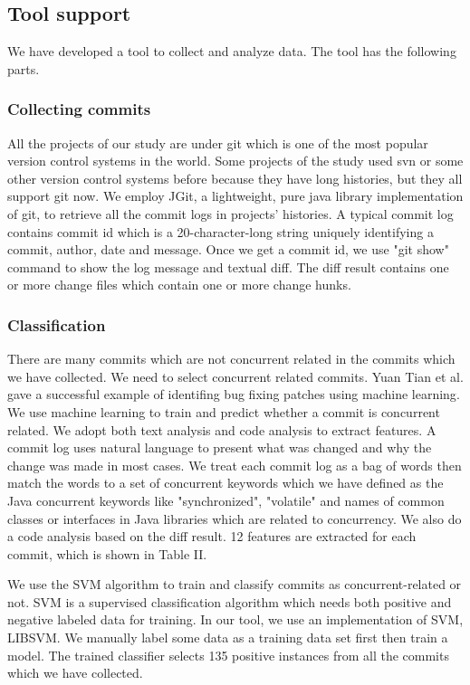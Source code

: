 \documentclass[conference]{IEEEtran}
\begin{document}
\subsection{Tool support}
We have developed a tool to collect and analyze data. The tool has the following parts.

\subsubsection{Collecting commits}
All the projects of our study are under git which is one of the most popular version control systems in the world. Some projects of the study used svn or some other version control systems before because they have long histories, but they all support git now. We employ JGit, a  lightweight, pure java library implementation of git, to retrieve all the commit logs in projects' histories. A typical commit log contains commit id which is a 20-character-long string uniquely identifying a commit, author, date and message. Once we get a commit id, we use "git show" command to show the log message and textual diff. The diff result contains one or more change files which contain one or more change hunks.

\subsubsection{Classification}
There are many commits which are not concurrent related in the commits which we have collected.  We need to select concurrent related commits. Yuan Tian et al. gave a successful example of identifing bug fixing patches using machine learning\cite{conf/icse/TianLL12}. We use machine learning to train and predict whether a commit is concurrent related. We adopt both text analysis and code analysis to extract features. A commit log uses natural language to present what was changed and why the change was made in most cases. We treat each commit log as a bag of words then match the words to a set of concurrent keywords which we have defined as the Java concurrent keywords like "synchronized", "volatile" and names of common classes or interfaces in Java libraries which are related to concurrency. We also do a code analysis based on the diff result. 12 features are extracted for each commit, which is shown in Table II.

We use the SVM\cite{journals/ml/CortesV95} algorithm to train and classify commits as concurrent-related or not. SVM is a supervised classification algorithm which needs both positive and negative labeled data for training. In our tool, we use an implementation of SVM, LIBSVM\cite{libsvm}. We manually label some data as a training data set first then train a model. The trained classifier selects 135 positive instances from all the commits which we have collected.
\end{document}
